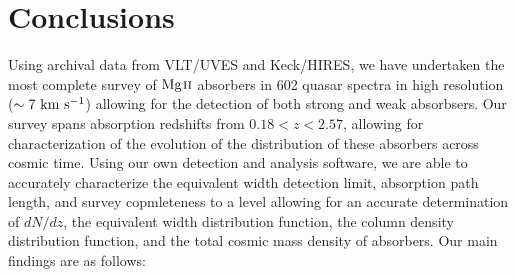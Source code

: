 \documentclass[iop,apj,numberedappendix,appendixfloats,twocolappendix]{emulateapj}
\begin{document}
\section{Conclusions}
\label{sec:conclusions}

Using archival data from VLT/UVES and Keck/HIRES, we have undertaken the most complete survey of ${\hbox{{\rm Mg}\kern 0.1em{\sc ii}}}$ absorbers in 602 quasar spectra in high resolution ($\sim 7~\mathrm{\hbox{km~s$^{-1}$}}$) allowing for the detection of both strong and weak {\MgII} absorbsers. Our survey spans absorption redshifts from $0.18 < z < 2.57$, allowing for characterization of the evolution of the distribution of these absorbers across cosmic time. Using our own detection and analysis software, we are able to accurately characterize the equivalent width detection limit, absorption path length, and survey copmleteness to a level allowing for an accurate determination of $dN\!/dz$, the equivalent width distribution function, the column density distribution function, and the total cosmic mass density of {\MgII} absorbers. Our main findings are as follows:
\end{document}
